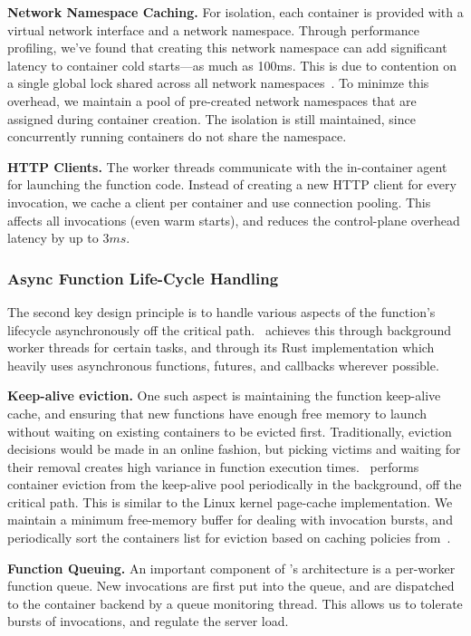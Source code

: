 \noindent \textbf{Network Namespace Caching.}
For isolation, each container is provided with a virtual network interface and a network namespace.
Through performance profiling, we've found that creating this network namespace can add significant latency to container cold starts---as much as 100ms.
This is due to contention on a single global lock shared across all network namespaces~\cite{oakes_sock_2018}. 
To minimze this overhead, we maintain a pool of pre-created network namespaces that are assigned during container creation. 
The isolation is still maintained, since concurrently running containers do not share the namespace. 

\noindent \textbf{HTTP Clients.}
The worker threads communicate with the in-container agent for launching the function code.
Instead of creating a new HTTP client for every invocation, we cache a client per container and use connection pooling. 
This affects all invocations (even warm starts), and reduces the control-plane overhead latency by up to $3ms$. 

\subsubsection{Async Function Life-Cycle Handling}

The second key design principle is to handle various aspects of the function's lifecycle asynchronously off the critical path.
\sysname~achieves this through background worker threads for certain tasks, and through its Rust implementation which heavily uses asynchronous functions, futures, and callbacks wherever possible. 

\noindent \textbf{Keep-alive eviction.}
One such aspect is maintaining the function keep-alive cache, and ensuring that new functions have enough free memory to launch without waiting on existing containers to be evicted first.
Traditionally, eviction decisions would be made in an online fashion, but picking victims and waiting for their removal creates high variance in function execution times. 
\sysname~performs container eviction from the keep-alive pool  periodically in the background, off the critical path. 
This is similar to the Linux kernel page-cache implementation. 
We maintain a minimum free-memory buffer for dealing with invocation bursts, and periodically sort the containers list for eviction based on caching policies from~\cite{faascache-asplos21}. 

\noindent \textbf{Function Queuing.}
An important component of \sysname's architecture is a per-worker function queue.
New invocations are first put into the queue, and are dispatched to the container backend by a queue monitoring thread. 
This allows us to tolerate bursts of invocations, and regulate the server load. 

